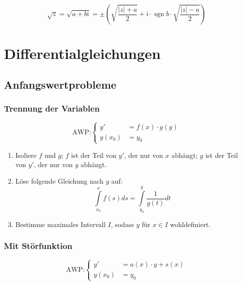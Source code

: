 \documentclass[a4paper, 16pt]{article}
\newcommand{\cmi}{\mathrm{i}}
\DeclareMathOperator{\sgn}{sgn}
\begin{document}
	\begin{equation*}
		\sqrt{z} = \sqrt{a + b\cmi} = \pm \left(\sqrt{\frac{|z| + a}{2}} + \cmi \cdot \sgn{b} \cdot \sqrt{\frac{|z| - a}{2}} \right)
	\end{equation*}

	\section{Differentialgleichungen}

	\subsection{Anfangswertprobleme}

	\subsubsection{Trennung der Variablen}

	\begin{equation*}
		\textrm{AWP:}
		\begin{cases}
			y' &= f(x) \cdot g(y) \\
			y(x_0) &= y_0
		\end{cases}
	\end{equation*}

	\begin{enumerate}
		\item Isoliere $f$ und $g$; $f$ ist der Teil von $y'$, der nur von $x$ abhängt; $g$ ist der Teil von $y'$, der nur von $y$ abhängt.
		\item Löse folgende Gleichung nach $y$ auf:
			\begin{equation*}
				\int\limits_{x_0}^{x}{f(s)}ds = \int\limits_{y_0}^{y}{\frac{1}{g(t)}}dt
			\end{equation*}
		\item Bestimme maximales Intervall $I$, sodass $y$ für $x \in I$ wohldefiniert.
	\end{enumerate}

	\subsubsection{Mit Störfunktion}

	\begin{equation*}
		\textrm{AWP:}
		\begin{cases}
			y' &= a(x) \cdot y + s(x) \\
			y(x_0) &= y_0
		\end{cases}
	\end{equation*}
\end{document}
